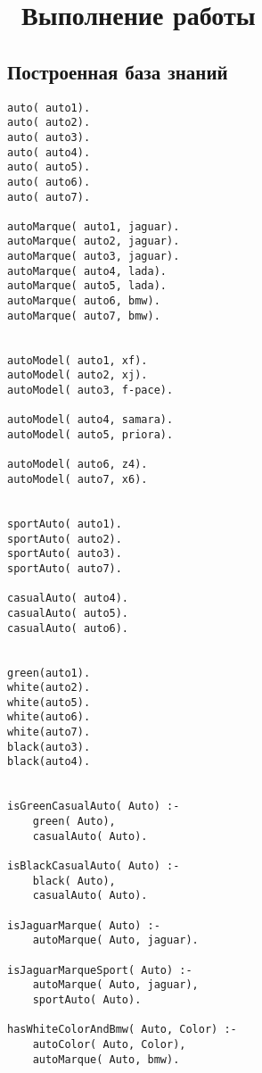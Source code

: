 \chapter{ Выполнение работы}
\label{cha:analysis}

\section{ Построенная база знаний}

\begin{lstlisting}[style=lispStyle, caption={Получение элементов списка с помощью команд car и cdr.},
                    label={lst:thirdtask}]
auto( auto1).
auto( auto2).
auto( auto3).
auto( auto4).
auto( auto5).
auto( auto6).
auto( auto7).

autoMarque( auto1, jaguar).
autoMarque( auto2, jaguar).
autoMarque( auto3, jaguar).
autoMarque( auto4, lada).
autoMarque( auto5, lada).
autoMarque( auto6, bmw).
autoMarque( auto7, bmw).


autoModel( auto1, xf).
autoModel( auto2, xj).
autoModel( auto3, f-pace).

autoModel( auto4, samara).
autoModel( auto5, priora).

autoModel( auto6, z4).
autoModel( auto7, x6).


sportAuto( auto1).
sportAuto( auto2).
sportAuto( auto3).
sportAuto( auto7).

casualAuto( auto4).
casualAuto( auto5).
casualAuto( auto6).


green(auto1).
white(auto2).
white(auto5).
white(auto6).
white(auto7).
black(auto3).
black(auto4).


isGreenCasualAuto( Auto) :-
    green( Auto),
    casualAuto( Auto).

isBlackCasualAuto( Auto) :-
    black( Auto),
    casualAuto( Auto).

isJaguarMarque( Auto) :-
    autoMarque( Auto, jaguar).

isJaguarMarqueSport( Auto) :- 
    autoMarque( Auto, jaguar),
    sportAuto( Auto).

hasWhiteColorAndBmw( Auto, Color) :-
    autoColor( Auto, Color),
    autoMarque( Auto, bmw).
\end{lstlisting}
